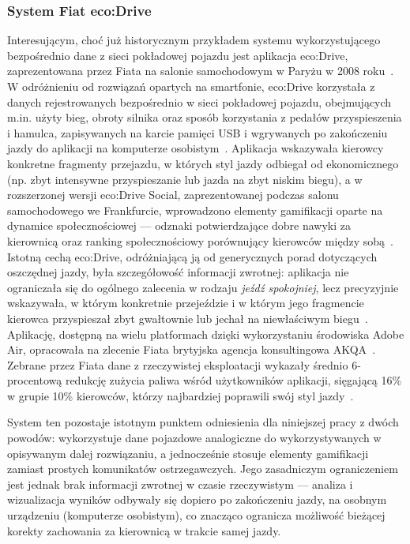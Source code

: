 \subsubsection{System Fiat eco:Drive}

Interesującym, choć już historycznym przykładem systemu wykorzystującego bezpośrednio
dane z sieci pokładowej pojazdu jest aplikacja eco:Drive, zaprezentowana przez Fiata
na salonie samochodowym w Paryżu w 2008 roku~\cite{fiatecodrive}. W odróżnieniu od
rozwiązań opartych na smartfonie, eco:Drive korzystała z danych rejestrowanych
bezpośrednio w sieci pokładowej pojazdu, obejmujących m.in. użyty bieg, obroty silnika
oraz sposób korzystania z pedałów przyspieszenia i hamulca, zapisywanych na karcie
pamięci USB i wgrywanych po zakończeniu jazdy do aplikacji na komputerze
osobistym~\cite{fiatecodrive}. Aplikacja wskazywała kierowcy konkretne fragmenty
przejazdu, w których styl jazdy odbiegał od ekonomicznego (np. zbyt intensywne
przyspieszanie lub jazda na zbyt niskim biegu), a w rozszerzonej wersji eco:Drive
Social, zaprezentowanej podczas salonu samochodowego we Frankfurcie, wprowadzono
elementy gamifikacji oparte na dynamice społecznościowej --- odznaki potwierdzające
dobre nawyki za kierownicą oraz ranking społecznościowy porównujący kierowców między
sobą~\cite{fiatecodrivesocial}.
Istotną cechą eco:Drive, odróżniającą ją od generycznych porad dotyczących
oszczędnej jazdy, była szczegółowość informacji zwrotnej: aplikacja nie ograniczała się
do ogólnego zalecenia w rodzaju \emph{jeźdź spokojniej}, lecz precyzyjnie wskazywała,
w którym konkretnie przejeździe i w którym jego fragmencie kierowca przyspieszał zbyt
gwałtownie lub jechał na niewłaściwym biegu~\cite{fiatecodrive}. Aplikację, dostępną na
wielu platformach dzięki wykorzystaniu środowiska Adobe Air, opracowała na zlecenie
Fiata brytyjska agencja konsultingowa AKQA~\cite{fiatecodrive}.
Zebrane przez Fiata dane z rzeczywistej eksploatacji wykazały średnio 6-procentową
redukcję zużycia paliwa wśród użytkowników aplikacji, sięgającą 16\% w grupie 10\%
kierowców, którzy najbardziej poprawili swój styl jazdy~\cite{fiatecodrive}.

System ten pozostaje istotnym punktem odniesienia dla niniejszej pracy z dwóch powodów:
wykorzystuje dane pojazdowe analogiczne do wykorzystywanych w opisywanym dalej
rozwiązaniu, a jednocześnie stosuje elementy gamifikacji zamiast prostych komunikatów
ostrzegawczych. Jego zasadniczym ograniczeniem jest jednak brak informacji zwrotnej
w czasie rzeczywistym --- analiza i wizualizacja wyników odbywały się dopiero po
zakończeniu jazdy, na osobnym urządzeniu (komputerze osobistym), co znacząco ogranicza
możliwość bieżącej korekty zachowania za kierownicą w trakcie samej jazdy.

